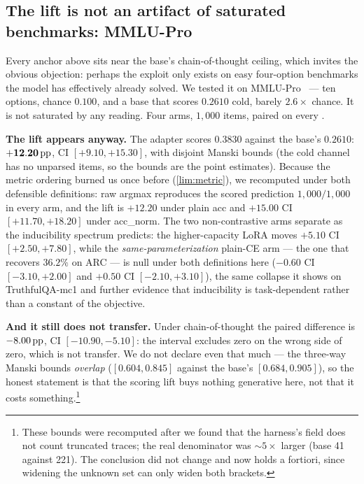 \subsection{The lift is not an artifact of saturated benchmarks: MMLU-Pro}
\label{results:mmlupro}

Every anchor above sits near the base's chain-of-thought ceiling, which invites the
obvious objection: perhaps the exploit only exists on easy four-option benchmarks the
model has effectively already solved. We tested it on MMLU-Pro~\citep{MMLUPro} --- ten options,
chance $0.100$, and a base that scores $\mathbf{0.2610}$ cold, barely $2.6\times$
chance. It is not saturated by any reading. Four arms, $1{,}000$ items, paired on
every .

\textbf{The lift appears anyway.} The adapter scores $0.3830$ against the base's
$0.2610$: $\mathbf{+12.20\,\mathrm{pp}}$, CI $[+9.10, +15.30]$, with disjoint Manski bounds
(the cold channel has no unparsed items, so the bounds are the point estimates).
Because the metric ordering burned us once before (\cref{lim:metric}), we recomputed
under both defensible definitions: raw argmax reproduces the scored prediction
$1{,}000/1{,}000$ in every arm, and the lift is $+12.20$ under plain acc and
$\mathbf{+15.00}$ CI $[+11.70, +18.20]$ under acc\_norm. The two
non-contrastive arms separate as the inducibility spectrum predicts: the
higher-capacity LoRA moves $+5.10$ CI $[+2.50, +7.80]$, while the
\emph{same-parameterization} plain-CE arm --- the one that recovers $36.2\%$ on ARC
--- is null under both definitions here ($-0.60$ CI $[-3.10, +2.00]$ and $+0.50$ CI
$[-2.10, +3.10]$), the same collapse it shows on TruthfulQA-mc1 and further evidence
that inducibility is task-dependent rather than a constant of the objective.

\textbf{And it still does not transfer.} Under chain-of-thought the paired difference
is $-8.00\,\mathrm{pp}$, CI $[-10.90, -5.10]$: the interval excludes zero on the wrong side of
zero, which is not transfer. We do not declare even that much --- the three-way
Manski bounds \emph{overlap} ($[0.604, 0.845]$ against the base's
$[0.684, 0.905]$), so the honest statement is that the scoring lift buys nothing
generative here, not that it costs something.\footnote{These bounds were recomputed
after we found that the harness's  field does not count truncated
traces; the real denominator was ${\sim}5\times$ larger (base 41 against 221). The
conclusion did not change and now holds a fortiori, since widening the unknown set
can only widen both brackets.}

